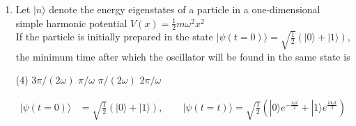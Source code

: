 \begin{enumerate}
\begin{tasks}
	\task[\textbf{a.}]
	\begin{figure}[H]
		\centering
		\texttt{[image: Net-June-20-27]}
	\end{figure}
	\task[\textbf{b.}]
		\begin{figure}[H]
		\centering
		\texttt{[image: Net-June-20-28]}
	\end{figure}
	\task[\textbf{c.}]
		\begin{figure}[H]
		\centering
		\texttt{[image: Net-June-20-29]}
	\end{figure}
	\task[\textbf{d.}] 
		\begin{figure}[H]
		\centering
		\texttt{[image: Net-June-20-30]}
	\end{figure}
\end{tasks}	
The material that would make the most sensitive temperature sensor, when used at temperatures between $T_{1}$ and $T_{2}$, is
 \begin{tasks}(4)
	\task[\textbf{a.}]$\mathrm{A}$
	\task[\textbf{b.}]$\mathrm{B}$
	\task[\textbf{c.}]$\mathrm{C}$
	\task[\textbf{d.}] D
\end{tasks}	
\begin{answer}
 For the temperature sensor, the variation in the resistivity of material should be as large as possible without any local maximum or minimum. Option (a) \& (d) shows minimum while in (b) gradient is very low in comparison to $(\mathrm{C})$. Thus option (c) is the correct answer\\
		So the correct answer is \textbf{Option (c)}
\end{answer}
\item  Let $|n\rangle$ denote the energy eigenstates of a particle in a one-dimensional simple harmonic potential $V(x)=\frac{1}{2} m \omega^{2} x^{2}$\\
If the particle is initially prepared in the state $|\psi(t=0)\rangle=\sqrt{\frac{1}{2}}(|0\rangle+|1\rangle)$, the minimum time after which the oscillator will be found in the same state is
 \begin{tasks}(4)
	\task[\textbf{a.}]$3 \pi /(2 \omega)$
	\task[\textbf{b.}]$\pi / \omega$
	\task[\textbf{c.}]$\pi /(2 \omega)$
	\task[\textbf{d.}] $2 \pi / \omega$
\end{tasks}
\begin{answer}
	\begin{align*}
	|\psi(t=0)\rangle&=\sqrt{\frac{1}{2}}(|0\rangle+|1\rangle), \qquad|\psi(t=t)\rangle=\sqrt{\frac{1}{2}}\left(|0\rangle e^{-\frac{i \omega t}{2}}+|1\rangle e^{\frac{i 3 \omega t}{2}}\right)\\

\end{align*}
\end{answer}
\end{enumerate}
